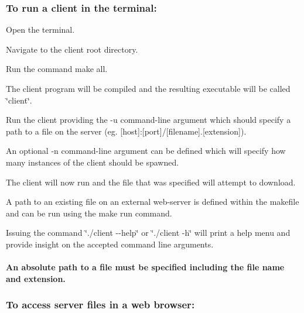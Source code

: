  \subsubsection*{To run a client in the terminal\+:}




\begin{DoxyEnumerate}
\item Open the terminal.
\item Navigate to the client root directory.
\item Run the command make all.
\item The client program will be compiled and the resulting executable will be called \char`\"{}client\char`\"{}.
\item Run the client providing the -\/u command-\/line argument which should specify a path to a file on the server (eg. \mbox{[}host\mbox{]}\+:\mbox{[}port\mbox{]}/\mbox{[}filename\mbox{]}.\mbox{[}extension\mbox{]}).
\item An optional -\/n command-\/line argument can be defined which will specify how many instances of the client should be spawned.
\item The client will now run and the file that was specified will attempt to download.
\end{DoxyEnumerate}
\begin{DoxyItemize}
\item A path to an existing file on an external web-\/server is defined within the makefile and can be run using the \textquotesingle{}make run\textquotesingle{} command.
\item Issuing the command \char`\"{}./client -\/-\/help\char`\"{} or \char`\"{}./client -\/h\char`\"{} will print a help menu and provide insight on the accepted command line arguments.
\end{DoxyItemize}

\paragraph*{An absolute path to a file must be specified including the file name and extension.}



 \subsubsection*{To access server files in a web browser\+:}




